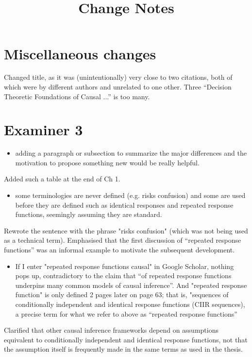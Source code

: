 \documentclass[12pt, a4paper]{article}
\title{Change Notes}
\begin{document}
\maketitle
\section{Miscellaneous changes}

Changed title, as it was (unintentionally) very close to two citations, both of which were by different authors and unrelated to one other. Three ``Decision Theoretic Foundations of Causal ...'' is too many.

\section{Examiner 3}
\begin{itemize}
    \item adding a paragraph or subsection to summarize the major differences and the motivation to propose something new would be really helpful.
\end{itemize}

Added such a table at the end of Ch 1.

\begin{itemize}
    \item some terminologies are never defined (e.g. risks confusion) and some are used before they are defined such as identical responses and repeated response functions, seemingly assuming they are standard.
\end{itemize}


Rewrote the sentence with the phrase "risks confusion" (which was not being used as a technical term). Emphasised that the first discussion of ``repeated response functions'' was an informal example to motivate the subsequent development.

\begin{itemize}
    \item If I enter "repeated response functions causal" in Google Scholar, nothing pops up, contradictory to the claim that “of repeated response functions underpins many common models of causal inference”. And "repeated response function" is only defined 2 pages later on page 63; that is, "sequences of conditionally independent and identical response functions (CIIR sequences), a precise term for what we refer to above as “repeated response functions”
\end{itemize}

Clarified that other causal inference frameworks depend on assumptions equivalent to conditionally independent and identical response functions, not that the assumption itself is frequently made in the same terms as used in the thesis.
\end{document}
